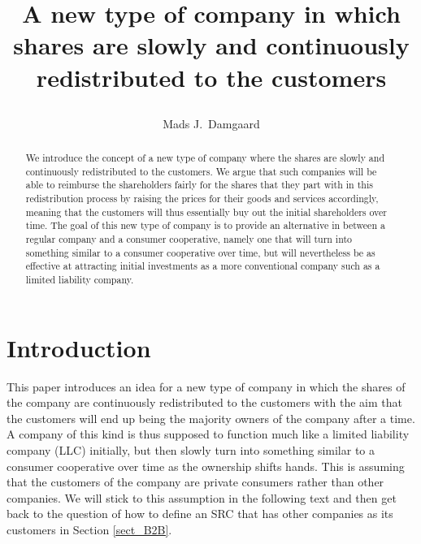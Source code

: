 \documentclass{article}
\title{
	A new type of company in which shares are slowly and continuously redistributed to the customers
	\author{Mads J.\ Damgaard%
	}
}
\begin{document}
\maketitle

\begin{abstract}
	We introduce the concept of a new type of company where the shares are slowly and continuously redistributed to the customers. 
	We argue that such companies will be able to reimburse the shareholders fairly for the shares that they part with in this redistribution process by raising the prices for their goods and services accordingly, meaning that the customers will thus essentially buy out the initial shareholders over time. 
	The goal of this new type of company is to provide an alternative in between a regular company and a consumer cooperative, namely one that will turn into something similar to a consumer cooperative over time, but will nevertheless be as effective at attracting initial investments as a more conventional company such as a limited liability company.
\end{abstract}


\section{Introduction}
This paper introduces an idea for a new type of company in which the shares of the company are continuously redistributed to the customers with the aim that the customers will end up being the majority owners of the company after a time. A company of this kind is thus supposed to function much like a limited liability company (LLC) initially, but then slowly turn into something similar to a consumer cooperative over time as the ownership shifts hands. 
%
This is assuming that the customers of the company are private consumers rather than other companies. We will stick to this assumption in the following text and then get back to the question of how to define an SRC that has other companies as its customers in Section \ref{sect_B2B}. 
\end{document}
